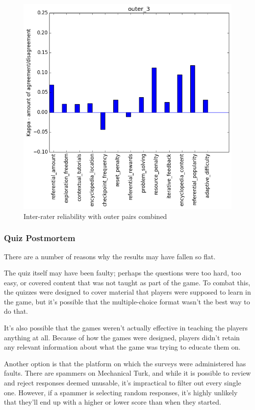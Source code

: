 			\begin{figure}[h] 
				\centering 
				\includegraphics[width=\textwidth]{outer_3_stats.png} 
				\caption{Inter-rater reliability with outer pairs combined}
			\end{figure}

		\subsubsection{Quiz Postmortem}
			There are a number of reasons why the results may have fallen so flat.

			The quiz itself may have been faulty; perhaps the questions were too hard, too easy, or covered content that was not taught as part of the game. To combat this, the quizzes were designed to cover material that players were supposed to learn in the game, but it's possible that the multiple-choice format wasn't the best way to do that.

			It's also possible that the games weren't actually effective in teaching the players anything at all. Because of how the games were designed, players didn't retain any relevant information about what the game was trying to educate them on.

			Another option is that the platform on which the surveys were administered has faults. There are spammers on Mechanical Turk, and while it is possible to review and reject responses deemed unusable, it's impractical to filter out every single one. However, if a spammer is selecting random responses, it's highly unlikely that they'll end up with a higher or lower score than when they started. 

